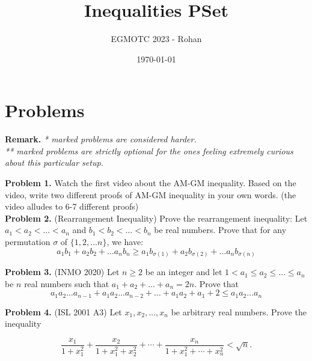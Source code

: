 \documentclass[12pt]{article}
\title{Inequalities PSet}
\author{EGMOTC 2023 - Rohan}
\date{\today}
\begin{document}
\maketitle

\newcommand{\localtextbulletone}{\textcolor{black}{\raisebox{.45ex}{\rule{.6ex}{.6ex}}}}
\renewcommand{\labelitemi}{\localtextbulletone}

\section*{Problems}
\vspace{1cm}
\thispagestyle{empty}

\textbf{Remark.} \textit{* marked problems are considered harder.\\ ** marked problems are strictly optional for the ones feeling extremely curious about this particular setup.\\}

\textbf{Problem 1.} Watch the first video about the AM-GM inequality. Based on the video, write two different proofs of AM-GM inequality in your own words. (the video alludes to 6-7 different proofs)\\

\textbf{Problem 2.} (Rearrangement Inequality) Prove the rearrangement inequality:
Let $a_1<a_2<\ldots <a_n$ and $b_1<b_2<\ldots < b_n$ be real numbers. Prove that for any permutation $\sigma$ of $\{1,2,\ldots n\}$, we have: \[a_1b_1+a_2b_2+\ldots a_nb_n \ge a_1b_{\sigma(1)}+a_2b_{\sigma(2)}+\ldots a_nb_{\sigma(n)}\]

\textbf{Problem 3.} (INMO 2020) Let $n \geqslant 2$ be an integer and let $1<a_1 \le a_2 \le \dots \le a_n$ be $n$ real numbers such that $a_1+a_2+\dots+a_n=2n$. Prove that \[a_1a_2\dots a_{n-1}+a_1a_2\dots a_{n-2}+\dots+a_1a_2+a_1+2 \leq a_1a_2\dots a_n\]

\textbf{Problem 4.} (ISL 2001 A3) Let $x_1,x_2,\ldots,x_n$ be arbitrary real numbers. Prove the inequality

\[
\frac{x_1}{1+x_1^2} + \frac{x_2}{1+x_1^2 + x_2^2} + \cdots +
\frac{x_n}{1 + x_1^2 + \cdots + x_n^2} < \sqrt{n}.
\]
\end{document}
